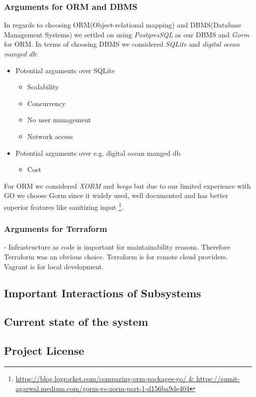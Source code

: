 \subsubsection{Arguments for ORM and DBMS}
In regards to choosing ORM(Object-relational mapping) and DBMS(Database Management Systems) we settled on 
using \textit{PostgresSQL} as our DBMS and \textit{Gorm} for ORM. In terms of choosing DBMS we considered 
\textit{SQLite} and \textit{digital ocean manged db}:
\begin{itemize}
    \item Potential arguments over SQLite 
    \begin{itemize}
        \item Scalability
        \item Concurrency
        \item No user management
        \item Network access        
    \end{itemize}
    \item Potential arguments over e.g. digital ocean manged db
    \begin{itemize}
        \item Cost
    \end{itemize}
\end{itemize}

For ORM we considered \textit{XORM} and \textit{beego} but due to our limited experience with GO we choose Gorm 
since it widely used, well documented and has better superior features like sanitizing input \footnote{\url{https://blog.logrocket.com/comparing-orm-packages-go/ & https://sumit-agarwal.medium.com/gorm-vs-xorm-part-1-d156ba9de404}}.


\subsubsection{Arguments for Terraform}
- Infrastructure as code is important for maintainability reasons. Therefore Terraform was an obvious choice.
Terraform is for remote cloud providers. Vagrant is for local development. 

\subsection{Important Interactions of Subsystems}

\subsection{Current state of the system}

\subsection{Project License}
